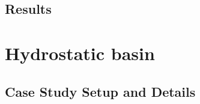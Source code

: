 \documentclass{../GPUSPHtemplate}
\begin{document}
\begin{itemize}
\vspace{20pt}
   
\end{itemize}

\subsection{Results}

\section{Hydrostatic basin}

\subsection{Case Study Setup and Details}
\vspace*{2pt}
\end{document}
